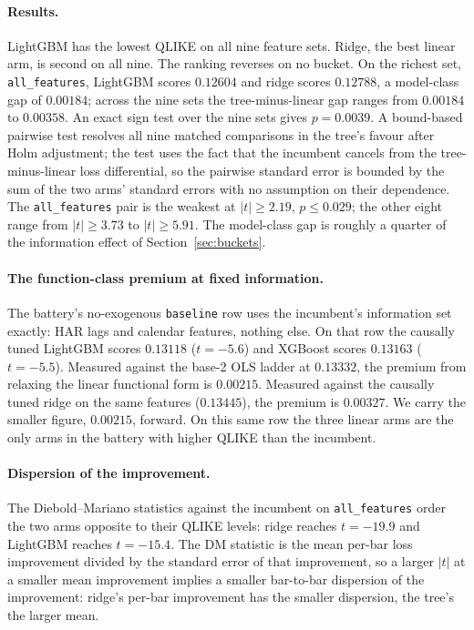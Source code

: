 \paragraph{Results.} LightGBM has the lowest QLIKE on all nine feature
sets. Ridge, the best linear arm, is second on all nine. The ranking
reverses on no bucket. On the richest set, \texttt{all\_features}, LightGBM
scores $0.12604$ and ridge scores $0.12788$, a model-class gap of
$0.00184$; across the nine sets the tree-minus-linear gap ranges from
$0.00184$ to $0.00358$. An exact sign test over the nine sets gives
$p = 0.0039$. A bound-based pairwise test resolves all nine matched
comparisons in the tree's favour after Holm adjustment; the test uses the
fact that the incumbent cancels from the tree-minus-linear loss
differential, so the pairwise standard error is bounded by the sum of the
two arms' standard errors with no assumption on their dependence. The
\texttt{all\_features} pair is the weakest at $|t| \ge 2.19$,
$p \le 0.029$; the other eight range from $|t| \ge 3.73$ to
$|t| \ge 5.91$. The model-class gap is roughly a quarter of the information
effect of Section~\ref{sec:buckets}.

\paragraph{The function-class premium at fixed information.} The battery's
no-exogenous \texttt{baseline} row uses the incumbent's information set
exactly: HAR lags and calendar features, nothing else. On that row the
causally tuned LightGBM scores $0.13118$ ($t = -5.6$) and XGBoost scores
$0.13163$ ($t = -5.5$). Measured against the base-2 OLS ladder at
$0.13332$, the premium from relaxing the linear functional form is
$0.00215$. Measured against the causally tuned ridge on the same features
($0.13445$), the premium is $0.00327$. We carry the smaller figure,
$0.00215$, forward. On this same row the
three linear arms are the only arms in the battery with higher QLIKE than
the incumbent.

\paragraph{Dispersion of the improvement.} The Diebold--Mariano statistics
\citep{DieboldMariano1995,HarveyLeybourneNewbold1997} against the incumbent
on \texttt{all\_features} order the two arms opposite to their QLIKE
levels: ridge reaches $t = -19.9$ and LightGBM reaches $t = -15.4$. The DM
statistic is the mean per-bar loss improvement divided by the standard
error of that improvement, so a larger $|t|$ at a smaller mean improvement
implies a smaller bar-to-bar dispersion of the improvement: ridge's
per-bar improvement has the smaller dispersion, the tree's the larger
mean.

